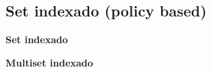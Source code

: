 \subsection{Set indexado (policy based)}
    \textbf{Set indexado}
    

    \textbf{Multiset indexado}
    